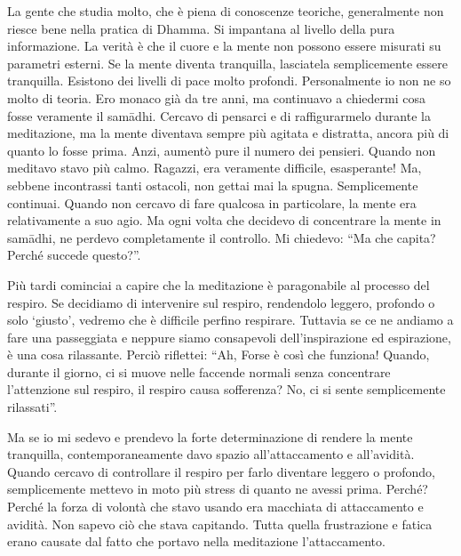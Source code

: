 La gente che studia molto, che è piena di conoscenze teoriche,
generalmente non riesce bene nella pratica di Dhamma. Si impantana al
livello della pura informazione. La verità è che il cuore e la mente non
possono essere misurati su parametri esterni. Se la mente diventa
tranquilla, lasciatela semplicemente essere tranquilla. Esistono dei
livelli di pace molto profondi. Personalmente io non ne so molto di
teoria. Ero monaco già da tre anni, ma continuavo a chiedermi cosa fosse
veramente il samādhi. Cercavo di pensarci e di raffigurarmelo durante la
meditazione, ma la mente diventava sempre più agitata e distratta,
ancora più di quanto lo fosse prima. Anzi, aumentò pure il numero dei
pensieri. Quando non meditavo stavo più calmo. Ragazzi, era veramente
difficile, esasperante! Ma, sebbene incontrassi tanti ostacoli, non
gettai mai la spugna. Semplicemente continuai. Quando non cercavo di
fare qualcosa in particolare, la mente era relativamente a suo agio. Ma
ogni volta che decidevo di concentrare la mente in samādhi, ne perdevo
completamente il controllo. Mi chiedevo: ``Ma che capita? Perché succede
questo?''.

Più tardi cominciai a capire che la meditazione è paragonabile al
processo del respiro. Se decidiamo di intervenire sul respiro,
rendendolo leggero, profondo o solo `giusto', vedremo che è difficile
perfino respirare. Tuttavia se ce ne andiamo a fare una passeggiata e
neppure siamo consapevoli dell'inspirazione ed espirazione, è una cosa
rilassante. Perciò riflettei: ``Ah, Forse è così che funziona! Quando,
durante il giorno, ci si muove nelle faccende normali senza concentrare
l'attenzione sul respiro, il respiro causa sofferenza? No, ci si sente
semplicemente rilassati''.

Ma se io mi sedevo e prendevo la forte
determinazione di rendere la mente tranquilla, contemporaneamente davo
spazio all'attaccamento e all'avidità. Quando cercavo di controllare il
respiro per farlo diventare leggero o profondo, semplicemente mettevo in
moto più stress di quanto ne avessi prima. Perché? Perché la forza di
volontà che stavo usando era macchiata di attaccamento e avidità. Non
sapevo ciò che stava capitando. Tutta quella frustrazione e fatica erano
causate dal fatto che portavo nella meditazione l'attaccamento.


